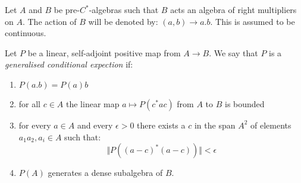 Let $A$ and $B$ be pre-$C^{*}$-algebras such that $B$ acts an algebra of right multipliers on $A$. The action of $B$ will be denoted by: $(a,b) \rightarrow a.b$. This is assumed to be continuous. 

\begin{definition}
Let $P$ be a linear, self-adjoint positive map from $A \rightarrow B$. We say that $P$ is a \textit{generalised conditional expection} if:
\begin{enumerate}
\item $P(a.b)=P(a)b$
\item for all $c \in A$ the linear map $a \mapsto P(c^{*}ac)$ from $A$ to $B$ is bounded
\item for every $a\in A$ and every $\epsilon > 0 $ there exists a $c$ in the span $A^{2}$ of elements $a_{1}a_{2}, a_{i} \in A$ such that:
\begin{equation*}
\Vert P((a-c)^{*}(a-c))\Vert < \epsilon
\end{equation*}
\item $P(A)$ generates a dense subalgebra of $B$.
\end{enumerate}
\end{definition}

